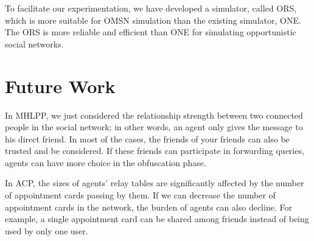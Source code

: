 \noindent To facilitate our experimentation, we have developed a simulator, called ORS, which is more suitable for OMSN simulation than the existing simulator, ONE. The ORS is more reliable and efficient than ONE for simulating opportunistic social networks. 


\section{ Future Work}

\noindent In MHLPP, we just considered the relationship strength between two connected people in the social network; in other words, an agent only gives the message to his direct friend. In most of the cases, the friends of your friends can also be trusted and be considered. If these friends can participate in forwarding queries, agents can have more choice in the obfuscation phase.

In ACP, the sizes of agents' relay tables are significantly affected by the number of appointment cards passing by them. If we can decrease the number of appointment cards in the network, the burden of agents can also decline. For example, a single appointment card can be shared among friends instead of being used by only one user.